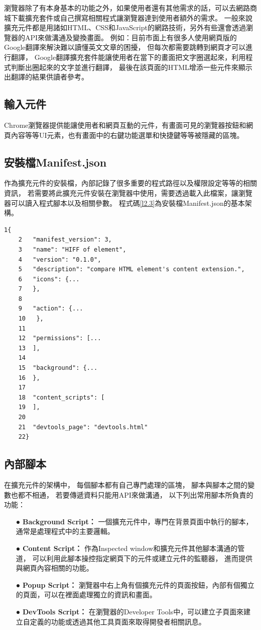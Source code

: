 瀏覽器除了有本身基本的功能之外，如果使用者還有其他需求的話，可以去網路商城下載擴充套件或自己撰寫相關程式讓瀏覽器達到使用者額外的需求。
一般來說擴充元件\cite{Chrome-Extension}\cite{Chrome-Extension-Thesis}都是用諸如HTML、CSS和JavaScript的網路技術，另外有些還會透過瀏覽器的API來做溝通及變換畫面。
例如：目前市面上有很多人使用網頁版的Google翻譯來解決難以讀懂英文文章的困擾，
但每次都需要跳轉到網頁才可以進行翻譯，
Google翻譯擴充套件能讓使用者在當下的畫面把文字圈選起來，利用程式判斷出圈起來的文字並進行翻譯，
最後在該頁面的HTML增添一些元件來顯示出翻譯的結果供讀者參考。

\subsection{輸入元件}\label{s2.6.1}
Chrome瀏覽器提供能讓使用者和網頁互動的元件，有畫面可見的瀏覽器按鈕和網頁內容等等UI元素，也有畫面中的右鍵功能選單和快捷鍵等等被隱藏的區塊。

\subsection{安裝檔Manifest.json}\label{s2.6.2}
作為擴充元件的安裝檔，內部記錄了很多重要的程式路徑以及權限設定等等的相關資訊，
若需要將此擴充元件安裝在瀏覽器中使用，需要透過載入此檔案，讓瀏覽器可以讀入程式腳本以及相關參數。
程式碼\ref{l2.3}為安裝檔Manifest.json的基本架構。

\begin{lstlisting}[caption=Manifest.json安裝檔之範例架構, label={l2.3}]
    1{
    2   "manifest_version": 3,
    3   "name": "HIFF of element",
    4   "version": "0.1.0",
    5   "description": "compare HTML element's content extension.",
    6   "icons": {...
    7   },
    8
    9   "action": {...
    10   },
    11
    12  "permissions": [...
    13  ],
    14
    15  "background": {...
    16  },
    17
    18  "content_scripts": [
    19  ],
    20
    21  "devtools_page": "devtools.html"
    22}
\end{lstlisting}

\subsection{內部腳本}\label{s2.6.3}
在擴充元件的架構中，
每個腳本都有自己專門處理的區塊，
腳本與腳本之間的變數也都不相通，
若要傳遞資料只能用API來做溝通，
以下列出常用腳本所負責的功能：

\begin{itemize}
    \item[●] \textbf{Background Script： }
    一個擴充元件中，專門在背景頁面中執行的腳本，通常是處理程式中的主要邏輯。
    \item[●] \textbf{Content Script： }
    作為Inspected window和擴充元件其他腳本溝通的管道，
    可以利用此腳本操控指定網頁下的元件或建立元件的監聽器，
    進而提供與網頁內容相關的功能。
    \item[●] \textbf{Popup Script： }
    瀏覽器中右上角有個擴充元件的頁面按鈕，內部有個獨立的頁面，可以在裡面處理獨立的資訊和畫面。
    \item[●] \textbf{DevTools Script： }
    在瀏覽器的Developer Tools中，可以建立子頁面來建立自定義的功能或透過其他工具頁面來取得開發者相關訊息。
\end{itemize}

